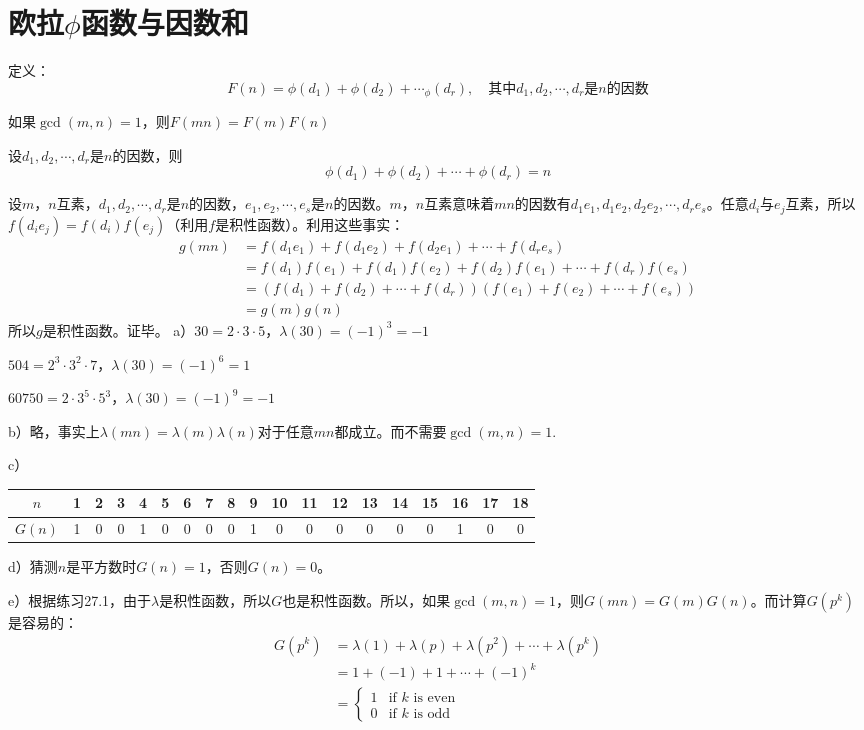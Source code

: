 \chapter{欧拉$\phi$函数与因数和}
定义：
\[F(n)=\phi(d_1)+\phi(d_2)+\cdots_\phi(d_r),\quad\text{其中$d_1,d_2,\cdots,d_r$是$n$的因数}\]
\begin{lemma}
如果$\gcd(m,n)=1$，则$F(mn)=F(m)F(n)$
\end{lemma}
\begin{theorem}
设$d_1,d_2,\cdots,d_r$是$n$的因数，则
\[\phi(d_1)+\phi(d_2)+\cdots+\phi(d_r)=n\]
\end{theorem}
%
\exercise 设$m$，$n$互素，$d_1,d_2,\cdots,d_r$是$n$的因数，$e_1,e_2,\cdots,e_s$是$n$的因数。$m$，$n$互素意味着$mn$的因数有$d_1e_1,d_1e_2,d_2e_2,\cdots,d_re_s$。任意$d_i$与$e_j$互素，所以$f(d_ie_j)=f(d_i)f(e_j)$（利用$f$是积性函数）。利用这些事实：
\begin{align*}
g(mn)&=f(d_1e_1)+f(d_1e_2)+f(d_2e_1)+\cdots+f(d_re_s)\\
&=f(d_1)f(e_1)+f(d_1)f(e_2)+f(d_2)f(e_1)+\cdots+f(d_r)f(e_s)\\
&=(f(d_1)+f(d_2)+\cdots+f(d_r))(f(e_1)+f(e_2)+\cdots+f(e_s))\\
&=g(m)g(n)
\end{align*}
所以$g$是积性函数。证毕。
%
\exercise a）$30=2\cdot3\cdot5$，$\lambda(30)=(-1)^3=-1$\par
$504=2^3\cdot3^2\cdot7$，$\lambda(30)=(-1)^6=1$\par
$60750=2\cdot3^5\cdot5^3$，$\lambda(30)=(-1)^9=-1$\par
b）略，事实上$\lambda(mn)=\lambda(m)\lambda(n)$对于任意$mn$都成立。而不需要$\gcd(m,n)=1$.\par
c）\begin{center}
\begin{tabular}{*{19}{c}}
\hline
$n$ & 1 & 2&3&4&5&6&7&8&9&10&11&12&13&14&15&16&17&18 \\
\hline
$G(n)$&1&0&0&1&0&0&0&0&1&0&0&0&0&0&0&1&0&0\\
\hline
\end{tabular}
\end{center}
d）猜测$n$是平方数时$G(n)=1$，否则$G(n)=0$。\par
e）根据练习27.1，由于$\lambda$是积性函数，所以$G$也是积性函数。所以，如果$\gcd(m,n)=1$，则$G(mn)=G(m)G(n)$。而计算$G(p^k)$是容易的：
\begin{align*}
G(p^k)&=\lambda(1)+\lambda(p)+\lambda(p^2)+\cdots+\lambda(p^k)\\
&=1+(-1)+1+\cdots + (-1)^k\\
&=\begin{cases}  
1 & \text{if $k$ is even} \\
0 & \text{if $k$ is odd}
\end{cases}
\end{align*}
